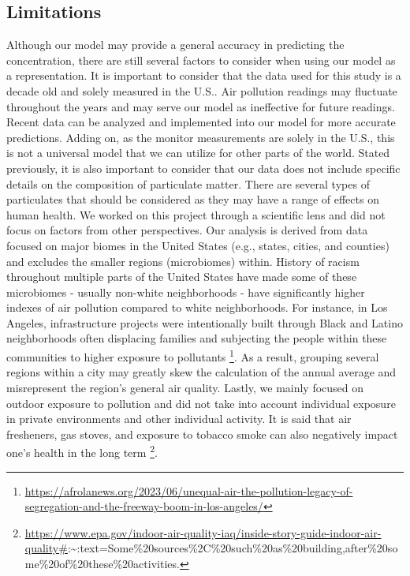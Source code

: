 \documentclass[
]{article}
\begin{document}
\subsection{Limitations}\label{limitations}

Although our model may provide a general accuracy in predicting the
concentration, there are still several factors to consider when using
our model as a representation. It is important to consider that the data
used for this study is a decade old and solely measured in the U.S.. Air
pollution readings may fluctuate throughout the years and may serve our
model as ineffective for future readings. Recent data can be analyzed
and implemented into our model for more accurate predictions. Adding on,
as the monitor measurements are solely in the U.S., this is not a
universal model that we can utilize for other parts of the world. Stated
previously, it is also important to consider that our data does not
include specific details on the composition of particulate matter. There
are several types of particulates that should be considered as they may
have a range of effects on human health. We worked on this project
through a scientific lens and did not focus on factors from other
perspectives. Our analysis is derived from data focused on major biomes
in the United States (e.g., states, cities, and counties) and excludes
the smaller regions (microbiomes) within. History of racism throughout
multiple parts of the United States have made some of these microbiomes
- usually non-white neighborhoods - have significantly higher indexes of
air pollution compared to white neighborhoods. For instance, in Los
Angeles, infrastructure projects were intentionally built through Black
and Latino neighborhoods often displacing families and subjecting the
people within these communities to higher exposure to pollutants
\footnote{\url{https://afrolanews.org/2023/06/unequal-air-the-pollution-legacy-of-segregation-and-the-freeway-boom-in-los-angeles/}}.
As a result, grouping several regions within a city may greatly skew the
calculation of the annual average and misrepresent the region's general
air quality. Lastly, we mainly focused on outdoor exposure to pollution
and did not take into account individual exposure in private
environments and other individual activity. It is said that air
fresheners, gas stoves, and exposure to tobacco smoke can also
negatively impact one's health in the long term \footnote{\url{https://www.epa.gov/indoor-air-quality-iaq/inside-story-guide-indoor-air-quality\#}:\textasciitilde:text=Some\%20sources\%2C\%20such\%20as\%20building,after\%20some\%20of\%20these\%20activities.}.
\end{document}
